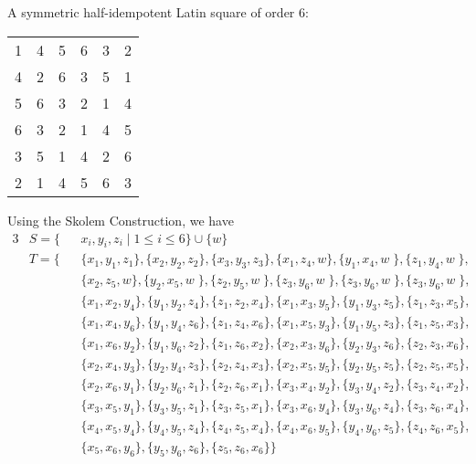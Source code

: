 \documentclass{article}
\begin{document}
\subsection{} %
A symmetric half-idempotent Latin square of order 6:
\newline
\newline
\begin{tabular}{cccccc}
	1 & 4 & 5 & 6 & 3 & 2\\
	4 & 2 & 6 & 3 & 5 & 1\\
	5 & 6 & 3 & 2 & 1 & 4\\
	6 & 3 & 2 & 1 & 4 & 5\\
	3 & 5 & 1 & 4 & 2 & 6\\
	2 & 1 & 4 & 5 & 6 & 3\\
\end{tabular}
\newline
\newline
Using the Skolem Construction, we have
\begin{alignat*}{3}
	&S=\{&&x_i,y_i,z_i\;|\;1\le i\le6\}\cup\{w\}\\
	&T=\{&&\{x_1,y_1,z_1\},
	\{x_2,y_2,z_2\},
	\{x_3,y_3,z_3\},
	\{x_1,z_4,w\},
	\{y_1,x_4,w\;\},
	\{z_1,y_4,w\;\},\\
	&&&\{x_2,z_5,w\},
	\{y_2,x_5,w\;\},
	\{z_2,y_5,w\;\},
	\{z_3,y_6,w\;\},
	\{z_3,y_6,w\;\},
	\{z_3,y_6,w\;\},\\
	&&&\{x_1,x_2,y_4\},
	\{y_1,y_2,z_4\},
	\{z_1,z_2,x_4\},
	\{x_1,x_3,y_5\},
	\{y_1,y_3,z_5\},
	\{z_1,z_3,x_5\},\\
	&&&\{x_1,x_4,y_6\},
	\{y_1,y_4,z_6\},
	\{z_1,z_4,x_6\},
	\{x_1,x_5,y_3\},
	\{y_1,y_5,z_3\},
	\{z_1,z_5,x_3\},\\
	&&&\{x_1,x_6,y_2\},
	\{y_1,y_6,z_2\},
	\{z_1,z_6,x_2\},
	\{x_2,x_3,y_6\},
	\{y_2,y_3,z_6\},
	\{z_2,z_3,x_6\},\\
	&&&\{x_2,x_4,y_3\},
	\{y_2,y_4,z_3\},
	\{z_2,z_4,x_3\},
	\{x_2,x_5,y_5\},
	\{y_2,y_5,z_5\},
	\{z_2,z_5,x_5\},\\
	&&&\{x_2,x_6,y_1\},
	\{y_2,y_6,z_1\},
	\{z_2,z_6,x_1\},
	\{x_3,x_4,y_2\},
	\{y_3,y_4,z_2\},
	\{z_3,z_4,x_2\},\\
	&&&\{x_3,x_5,y_1\},
	\{y_3,y_5,z_1\},
	\{z_3,z_5,x_1\},
	\{x_3,x_6,y_4\},
	\{y_3,y_6,z_4\},
	\{z_3,z_6,x_4\},\\
	&&&\{x_4,x_5,y_4\},
	\{y_4,y_5,z_4\},
	\{z_4,z_5,x_4\},
	\{x_4,x_6,y_5\},
	\{y_4,y_6,z_5\},
	\{z_4,z_6,x_5\},\\
	&&&\{x_5,x_6,y_6\},
	\{y_5,y_6,z_6\},
	\{z_5,z_6,x_6\}
	\}
\end{alignat*}
\end{document}
